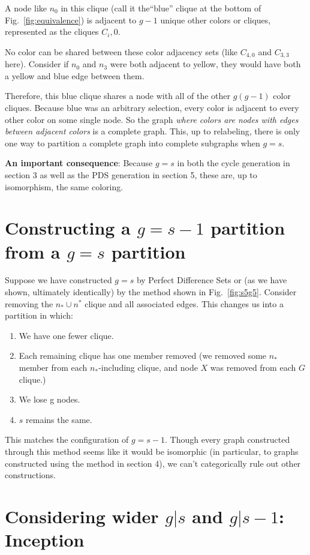 \documentclass[11pt, oneside]{article} 	%
\begin{document}
A node like $n_0$ in this clique (call it the``blue'' clique at the bottom of Fig.~\ref{fig:equivalence}) is adjacent to $g-1$ unique other colors or cliques, represented as the cliques $C_i,0$.

No color can be shared between these color adjacency sets (like $C_{4,0}$ and $C_{3,3}$ here). Consider if $n_0$ and $n_3$ were both adjacent to yellow, they would have both a yellow and blue edge between them.

Therefore, this blue clique shares a node with all of the other $g(g-1)$ color cliques. Because blue was an arbitrary selection, every color is adjacent to every other color on some single node.
So the graph \emph{where colors are nodes with edges between adjacent colors} is a complete graph. This, up to relabeling, there is only one way to partition a complete graph into complete subgraphs when $g=s$.

\textbf{An important consequence}: Because $g=s$ in both the cycle generation in section 3 as well as the PDS generation in section 5, these are, up to isomorphism, the same coloring.

\section{Constructing a $g=s-1$ partition from a $g=s$ partition}

Suppose we have constructed $g=s$ by Perfect Difference Sets or (as we have shown, ultimately identically) by the method shown in Fig.~\ref{fig:s5g5}. Consider removing the $n_* \cup n^*$ clique and all associated edges. This changes us into a partition in which:
 
\begin{enumerate}
\item We have one fewer clique.
\item Each remaining clique has one member removed (we removed some $n_*$ member from each $n_*$-including clique, and node $X$ was removed from each $G$ clique.)
\item We lose g nodes.
\item $s$ remains the same.
\end{enumerate}

This matches the configuration of $g=s-1$. Though every graph constructed through this method seems like it would be isomorphic (in particular, to graphs constructed using the method in section 4), we can't categorically rule out other constructions. 

\section{Considering wider $g | s$ and $g | s-1$: Inception}
\end{document}

